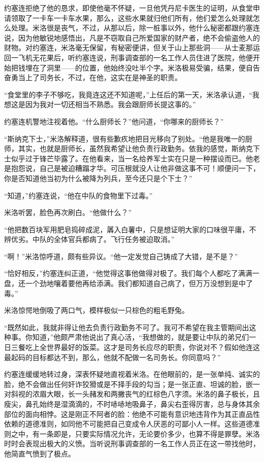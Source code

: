     约塞连拒绝了他的恳求，即使他毫不怀疑，一旦他凭丹尼卡医生的证明，从食堂申请领取了一卡车一卡车水果，那么，这些水果就归他们所有，他们爱怎么处理就怎么处理。米洛很是丧气，不过，从那以后，除一桩事以外，他什么秘密都跟约塞连说，因为他敏锐地感悟出，凡是不窃取自己所爱国家的财产者，绝不会偷盗他人的财物。对约塞连，米洛毫无保留，有秘密便讲，但关于山上那些洞——从士麦那运回一飞机无花果后，听约塞连说，刑事调查部的一名工作人员住进了医院，他便开始把钱埋在了洞里——的位置，他始终没吐半个字。米洛极易受骗，结果，便自告奋勇当上了司务长，不过，在他，这实在是神圣的职责。

    “食堂里的李子不够吃，我竟连这还不知道呢，”上任后的第一天，米洛承认道，“我想这是因为我对一切还相当不熟悉。我会跟厨师长提这事的。”

    约塞连机警地注视着他。“什么厨师长？”他问道，“你哪来的厨师长？”

    “斯纳克下士，”米洛解释道，很有些歉疚地把目光移向了别处。“他是我唯一的厨师，其实，也就是厨师长，虽然我希望让他负责行政勤务。依我的感觉，斯纳克下士似乎过于锋芒毕露了。在他看来，当一名给养军士实在只是一种摆设而已。他老是抱怨说，自己是被迫糟蹋才华。可压根就没人让他非做这事不可！顺便问一下，你是否知道他当初为什么被降为列兵，至今还只是个下士？”

    “知道，”约塞连说，“他在中队的食物里下过毒。”

    米洛听罢，脸色再次刷白。“他做什么？”

    “他把数百块军用肥皂捣碎成泥，羼入白薯中，只是想证明大家的口味很平庸，不辨优劣。中队的全体官兵都病了。飞行任务被迫取消。”

    “啊！”米洛惊呼道，颇有些异议。“他一定发觉自己铸成了大错，是不是？”

    “恰好相反，”约塞连纠正道，“他觉得这事他做得对极了。我们每个人都吃了满满一盘，还一个劲地嚷着要他再给添满。我们都知道自己病了，但万万没想到是中了毒。”

    米洛惊愕地倒吸了两口气，模样极似一只棕色的粗毛野兔。

    “既然如此，我就非得让他去负责行政勤务不可了。我可不希望在我主管期间出这种事。你知道，”他颇严肃他说出了真心活，“我想做的，就是要让中队的弟兄们一日三餐吃上全世界最好的饭菜。这才是司务长应尽的职责，你说对不？假如他连这最起码的目标都达不到，那么，他就不配做一名司务长。你同意吗？”

    约塞连缓缓地转过身，深表怀疑地直视着米洛。在他眼前的，是一张单纯、诚实的脸，绝不会做出任何奸诈狡猾或是不择手段的勾当；是一张正直、坦诚的脸，嵌一对斜视的浓眉大眼，长一头赭发和两撇丧气的红棕色八字须。米洛的鼻子极长，且瘦尖，鼻孔始终是湿滴滴的，不时哧哧地吸鼻子，鼻尖右歪得厉害，总与身体其余部位的面向相悖。这是刚正不阿者的脸：他绝不可能有意识地违背作为其正直品性依赖的道德准则，如同他不可能把自己变成令人厌恶的可鄙小人一样。这些道德准则之中，有一条即是，只要实际情况允许，无论要价多少，也算不得是罪孽。米洛时时会表现出极大的义愤。当听说刑事调查部的一名工作人员正在这一带找他时，他简直气愤到了极点。
 


